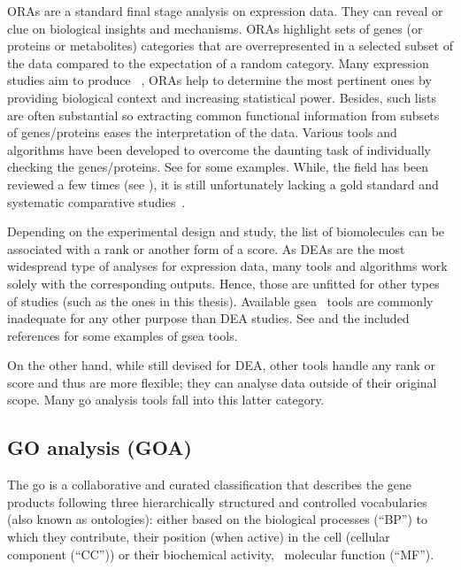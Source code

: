 \Glspl{ORA} are a standard final stage analysis on expression data.
They can reveal or clue on biological insights and mechanisms.
\Glspl{ORA} highlight sets of genes (or proteins or metabolites) categories
that are overrepresented in a selected subset of the data
compared to the expectation of a random category.
Many expression studies aim to produce ~,
\glspl{ORA} help to determine the most pertinent ones
by providing biological context and increasing statistical power.
Besides, such lists are often substantial
so extracting common functional information from subsets of genes/proteins eases
the interpretation of the data.
Various tools and algorithms have been developed
to overcome the daunting task of individually checking the genes/proteins.
See \citet{Shi_Jing2015-yh} for some examples.
While, the field has been reviewed a few times
(see \citet{Khatri2005-su,Huang2009-zk,Khatri2012-ki}),
it is still unfortunately lacking a gold standard
and systematic comparative studies~.

Depending on the experimental design and study,
the list of biomolecules can be associated with a rank or another form of a score.
As \glspl{DEA} are the most widespread type of analyses for expression data,
many tools and algorithms work solely with the corresponding outputs.
Hence, those are unfitted for other types of studies
(such as the ones in this thesis).
Available \gls{gsea}~ tools are commonly inadequate
for any other purpose than \gls{DEA} studies.
See \citet{Tamayo2012-qw,Irizarry2009-sc}
and the included references for some examples of \gls{gsea} tools.

On the other hand, while still devised for \gls{DEA},
other tools handle any rank or score and thus are more flexible;
they can analyse data outside of their original scope.
Many \gls{go} analysis tools fall into this latter category.\\
\vspace{-\baselineskip}

\subsection{GO analysis (GOA)}\label{sec:goaGeneralities}
The \gls{go} is a collaborative and curated classification
that describes the gene products
following three hierarchically structured and controlled vocabularies
(also known as ontologies):
either based on the biological processes (\enquote{BP}) to which they contribute,
their position (when active) in the cell (cellular component (\enquote{CC})) or
their biochemical activity, \ie\ molecular function (\enquote{MF}).~

